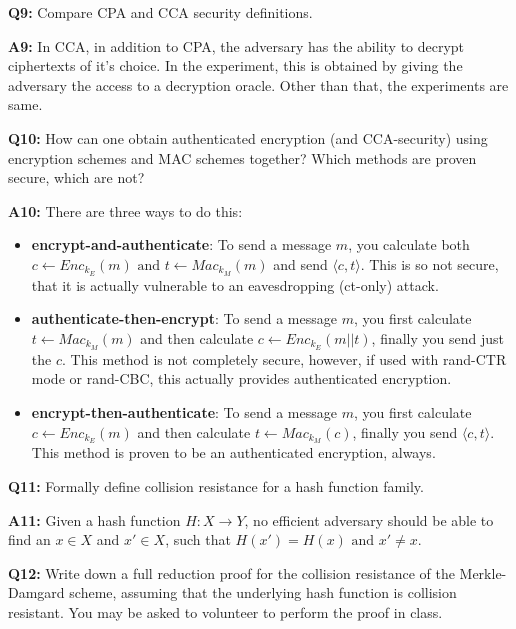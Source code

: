\documentclass[12pt,reqno]{amsart}
\newcommand{\mand}[0]{\text{ and }}
\begin{document}
\vspace{20px}
\textbf{Q9:} Compare CPA and CCA security definitions.

\textbf{A9:} In CCA, in addition to CPA, the adversary has the ability to decrypt ciphertexts of it's choice. In the experiment, this is obtained by giving the adversary the access to a decryption oracle. Other than that, the experiments are same.

\vspace{20px}
\textbf{Q10:} How can one obtain authenticated encryption (and CCA-security) using encryption schemes and MAC schemes together? Which methods are proven secure, which are not?

\textbf{A10:} There are three ways to do this:
\begin{itemize}
\item \textbf{encrypt-and-authenticate}: To send a message $m$, you calculate both $c \xleftarrow{} Enc_{k_E}(m) \mand t \xleftarrow{} Mac_{k_M}(m)$ and send $\langle c, t \rangle$. This is so not secure, that it is actually vulnerable to an eavesdropping (ct-only) attack.
\item \textbf{authenticate-then-encrypt}: To send a message $m$, you first calculate $t \xleftarrow{} Mac_{k_M}(m)$ and then calculate $c \xleftarrow{} Enc_{k_E}(m || t)$, finally you send just the $c$. This method is  not completely secure, however, if used with rand-CTR mode or rand-CBC, this actually provides authenticated encryption.
\item \textbf{encrypt-then-authenticate}: To send a message $m$, you first calculate  $c \xleftarrow{} Enc_{k_E}(m)$ and then calculate $t \xleftarrow{} Mac_{k_M}(c)$, finally you send $\langle c, t \rangle$. This method is proven to be an authenticated encryption, always.
\end{itemize}

\vspace{20px}
\textbf{Q11:} Formally define collision resistance for a hash function family. 

\textbf{A11:} Given a hash function $H : X \xrightarrow{} Y$, no efficient adversary should be able to find an $x \in X$ and $x' \in X$, such that $H(x')=H(x) \mand x' \ne x$.

\vspace{20px}
\textbf{Q12:} Write down a full reduction proof for the collision resistance of the Merkle-Damgard scheme, assuming that the underlying hash function is collision resistant. You may be asked to volunteer to perform the proof in class.
\end{document}
